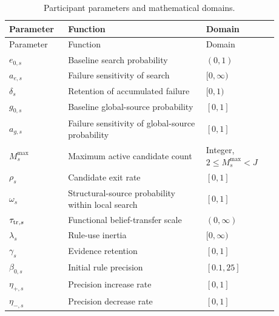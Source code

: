 {\small
\begin{longtable}{>{\raggedright\arraybackslash}p{0.18\linewidth}>{\raggedright\arraybackslash}p{0.46\linewidth}>{\raggedright\arraybackslash}p{0.24\linewidth}}
\caption{Participant parameters and mathematical domains.}\label{tab:behavior-parameters}\\
\toprule
Parameter & Function & Domain\\
\midrule
\endfirsthead
\toprule
Parameter & Function & Domain\\
\midrule
\endhead
$e_{0,s}$ & Baseline search probability & $(0,1)$\\
$a_{e,s}$ & Failure sensitivity of search & $[0,\infty)$\\
$\delta_s$ & Retention of accumulated failure & $[0,1)$\\
$g_{0,s}$ & Baseline global-source probability & $[0,1]$\\
$a_{g,s}$ & Failure sensitivity of global-source probability & $[0,1]$\\
$M_s^{\max}$ & Maximum active candidate count & Integer, $2\leq M_s^{\max}<J$\\
$\rho_s$ & Candidate exit rate & $[0,1]$\\
$\omega_s$ & Structural-source probability within local search & $[0,1]$\\
$\tau_{{\rm tr},s}$ & Functional belief-transfer scale & $(0,\infty)$\\
$\lambda_s$ & Rule-use inertia & $[0,\infty)$\\
$\gamma_s$ & Evidence retention & $[0,1]$\\
$\beta_{0,s}$ & Initial rule precision & $[0.1,25]$\\
$\eta_{+,s}$ & Precision increase rate & $[0,1]$\\
$\eta_{-,s}$ & Precision decrease rate & $[0,1]$\\
\bottomrule
\end{longtable}
}

